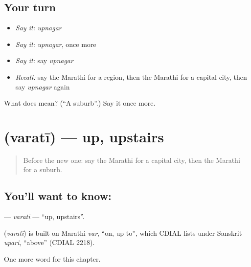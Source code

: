 \subsection*{Your turn}
\begin{itemize}
\raggedright
  \item \emph{Say it:} \emph{upnagar}
  \item \emph{Say it:} \emph{upnagar}, once more
  \item \emph{Say it:} say \emph{upnagar}
  \item \emph{Recall:} say the Marathi for a region, then the Marathi for a capital city, then say \emph{upnagar} again
\end{itemize}

\begin{tcolorbox}[breakable,colback=teal!4,colframe=teal!35!black,title={Before you move on}]
What does  mean? (\textquotedblleft{}A suburb\textquotedblright{}.) Say it once more.
\end{tcolorbox}
\section[\texorpdfstring{\mr{वरती} (varatī)}{वरती (varatī)}]{ (varatī) — up, upstairs}

\label{lesson:MR-C202-varati}



\begin{quote}
Before the new one: say the Marathi for a capital city, then the Marathi for a suburb.
\end{quote}

\subsection*{You'll want to know: }
\textbf{} — \emph{varatī} — \textquotedblleft{}up, upstairs\textquotedblright{}.

\begin{cousinweb}
\textbf{} (\emph{varatī}) is built on Marathi \emph{var}, \textquotedblleft{}on, up to\textquotedblright{}, which CDIAL lists under Sanskrit \emph{upari}, \textquotedblleft{}above\textquotedblright{} (CDIAL 2218).
\end{cousinweb}

\begin{grammarlens}[title={What you've built}]
One more word for this chapter.
\end{grammarlens}

